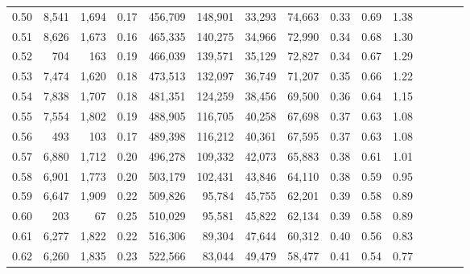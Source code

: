 \begin{tabular}{rrrcrrrrrrrrrrr}
0.50 &   8,541 &   1,694 &                                       0.17 &  456,709 &  148,901 &   33,293 &   74,663 &  0.33 &  0.69 &                         1.38 \\
0.51 &   8,626 &   1,673 &                                       0.16 &  465,335 &  140,275 &   34,966 &   72,990 &  0.34 &  0.68 &                         1.30 \\
0.52 &     704 &     163 &                                       0.19 &  466,039 &  139,571 &   35,129 &   72,827 &  0.34 &  0.67 &                         1.29 \\
0.53 &   7,474 &   1,620 &                                       0.18 &  473,513 &  132,097 &   36,749 &   71,207 &  0.35 &  0.66 &                         1.22 \\
0.54 &   7,838 &   1,707 &                                       0.18 &  481,351 &  124,259 &   38,456 &   69,500 &  0.36 &  0.64 &                         1.15 \\
0.55 &   7,554 &   1,802 &                                       0.19 &  488,905 &  116,705 &   40,258 &   67,698 &  0.37 &  0.63 &                         1.08 \\
0.56 &     493 &     103 &                                       0.17 &  489,398 &  116,212 &   40,361 &   67,595 &  0.37 &  0.63 &                         1.08 \\
0.57 &   6,880 &   1,712 &                                       0.20 &  496,278 &  109,332 &   42,073 &   65,883 &  0.38 &  0.61 &                         1.01 \\
0.58 &   6,901 &   1,773 &                                       0.20 &  503,179 &  102,431 &   43,846 &   64,110 &  0.38 &  0.59 &                         0.95 \\
0.59 &   6,647 &   1,909 &                                       0.22 &  509,826 &   95,784 &   45,755 &   62,201 &  0.39 &  0.58 &                         0.89 \\
0.60 &     203 &      67 &                                       0.25 &  510,029 &   95,581 &   45,822 &   62,134 &  0.39 &  0.58 &                         0.89 \\
0.61 &   6,277 &   1,822 &                                       0.22 &  516,306 &   89,304 &   47,644 &   60,312 &  0.40 &  0.56 &                         0.83 \\
0.62 &   6,260 &   1,835 &                                       0.23 &  522,566 &   83,044 &   49,479 &   58,477 &  0.41 &  0.54 &                         0.77 \\

\end{tabular}
